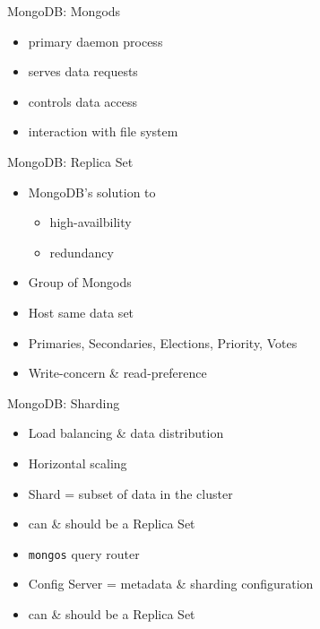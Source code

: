 \documentclass[11pt,aspectratio=169]{beamer}
\begin{document}
    \begin{frame}{MongoDB: Mongods}
      \begin{itemize}
              \item primary daemon process
              \item serves data requests
              \item controls data access
              \item interaction with file system 
      \end{itemize}
    \end{frame}
    \begin{frame}{MongoDB: Replica Set}
      \begin{itemize}
              \item MongoDB's solution to 
                      \begin{itemize}
                        \item high-availbility
                        \item redundancy
                      \end{itemize}
              \item Group of Mongods
              \item Host same data set
              \item Primaries, Secondaries, Elections, Priority, Votes
              \item Write-concern \& read-preference
      \end{itemize}
    \end{frame}

    \begin{frame}{MongoDB: Sharding}
      \begin{itemize}
              \item Load balancing \& data distribution
              \item Horizontal scaling
              \item Shard = subset of data in the cluster
              \item can \& should be a Replica Set
              \item \texttt{mongos} query router 
              \item Config Server = metadata \& sharding configuration
              \item can \& should be a Replica Set
      \end{itemize}
    \end{frame}
    
\end{document}
